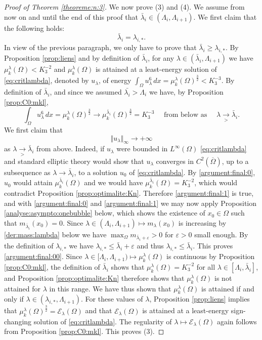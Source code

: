 \documentclass[10pt]{amsart}
\numberwithin{equation}{section}
\newcommand{\ve}{\varepsilon}
\newcommand{\Om}{\Omega}
\newcommand{\ben}{\begin{equation}}
\newcommand{\een}{\end{equation}}
\newcommand{\mkl}{\mu_{k}^{\lambda}}
\theoremstyle{plain}
\theoremstyle{remark}
\begin{document}
\begin{proof}[Proof of Theorem \ref{theoreme:n:3}]
We now prove (3) and (4). We assume from now on and until the end of this proof that $\bar{\lambda}_i \in (\Lambda_i, \Lambda_{i+1})$. We first claim that the following holds: 
\ben \label{argument:final:00}
\bar{\lambda}_i = \lambda_{i,*}.
\een
In view of the previous paragraph, we only have to prove that $\bar{\lambda}_i \ge \lambda_{i,*}$. By Proposition \ref{prop:liens} and by definition of $\bar{\lambda}_i$, for any $\lambda \in (\bar{\lambda}_i, \Lambda_{i+1})$ we have $\mkl(\Om) < K_3^{-2}$ and  $\mu_k^{\lambda}(\Om)$ is attained  at a least-energy solution of \eqref{eq:critlambda}, denoted by $u_\lambda$, of energy $\int_{\Om} u_\lambda^6 \, dx  = \mkl(\Om)^{\frac{3}{2}} < K_3^{-3}$. By definition of $\bar{\lambda}_i$, and since we assumed $\bar{\lambda_i} > \Lambda_i$ we have, by Proposition \ref{prop:C0:mkl}, 
\ben \label{argument:final:0}
\int_{\Om} u_\lambda^6 \, dx = \mkl(\Om)^{\frac32} \to \mu_k^{\bar{\lambda}_i}(\Om)^{\frac32} =  K_3^{-3} \quad  \text{ from below as } \quad \lambda \underset{> }{\to} \bar{\lambda}_{i}.
\een 
 We first claim that 
\ben \label{argument:final:1}
 \Vert u_\lambda \Vert_{\infty} \to + \infty 
 \een
as $\lambda \underset{> }{\to} \bar{\lambda}_{i}$ from above. Indeed, if $u_\lambda$ were bounded in $L^\infty(\Om)$ \eqref{eq:critlambda} and standard elliptic theory would show that $u_\lambda$ converges in $C^2(\overline{\Om})$, up to a subsequence as $\lambda \to \bar{\lambda}_i$, to a solution $u_0$ of \eqref{eq:critlambda}. By \eqref{argument:final:0}, $u_0$ would attain $\mu_k^{\bar{\lambda}_i}(\Om)$ and we would have $\mu_k^{\bar{\lambda}_i}(\Om) =  K_3^{-2}$, which would contradict Proposition \ref{prop:optimalite:Kn}. Therefore \eqref{argument:final:1} is true, and with  \eqref{argument:final:0} and \eqref{argument:final:1} we may now apply Proposition \ref{analyse:asympto:onebubble} below, which shows the existence of $x_0 \in \Om$ such that $m_{\bar{\lambda}_i}(x_0) = 0$. Since $\lambda \in (\Lambda_i, \Lambda_{i+1}) \mapsto m_\lambda(x_0)$ is increasing by \eqref{der:mass:lambda} below we have $\max_{\Om} m_{\bar{\lambda}_i + \ve} >0$ for $\ve >0$ small enough. By the definition of $\lambda_{i,*}$ we have $\lambda_{i,*} \le \bar{\lambda}_i + \ve$ and thus $\lambda_{i,*} \le \bar{\lambda}_i$. This proves \eqref{argument:final:00}. Since $\lambda \in [\Lambda_i, \Lambda_{i+1}) \mapsto \mkl(\Om)$ is continuous by Proposition \ref{prop:C0:mkl}, the definition of $\bar{\lambda}_i$ shows that $\mkl(\Om) = K_3^{-2}$ for all $\lambda \in [\Lambda_i, \bar{\lambda}_i]$, and Proposition \ref{prop:optimalite:Kn} therefore shows that $\mkl(\Om)$ is not attained for $\lambda$ in this range. We have thus shown that  $\mkl(\Om)$ is attained if and only if $ \lambda \in (\lambda_{i,*}, \Lambda_{i+1})$. For these values of $\lambda$, Proposition \ref{prop:liens} implies that  $\mkl(\Om)^{\frac32} = \mathcal{E}_{\lambda}(\Om)$ and that $\mathcal{E}_\lambda(\Om)$ is attained at a least-energy sign-changing solution of \eqref{eq:critlambda}. The regularity of $\lambda \mapsto \mathcal{E}_\lambda(\Om)$ again follows from Proposition \ref{prop:C0:mkl}. This proves (3). 


\end{proof}
\end{document}
